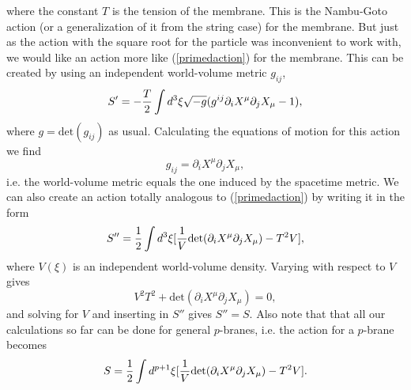 where the constant $T$ is the tension of the membrane. This is the Nambu-Goto action (or a generalization of it from the string case) for the membrane. 
But just as the action with the square root for the particle was inconvenient to work with, we would like an action more like 
(\ref{primedaction}) for the membrane. This can be created by using an independent world-volume metric $g_{ij}$,
\begin{equation}
S'=-{T \over 2}\int d^3 \xi \sqrt{-g} (g^{ij}\partial_i X^{\mu} \partial_j X_{\mu} -1),
\end{equation}
where $g=\mbox{det}(g_{ij})$ as usual. Calculating the equations of motion for this action we find
\begin{equation}
g_{ij}=\partial_i X^{\mu} \partial_j X_{\mu},
\end{equation}
i.e. the world-volume metric equals the one induced by the spacetime metric. We can also create an action totally analogous to (\ref{primedaction}) by writing it in the form
\begin{equation}
S''={1 \over 2}\int d^3 \xi [{1 \over V}\mbox{det}(\partial_i X^{\mu} \partial_j X_{\mu})-T^2V],
\end{equation}
where $V(\xi)$ is an independent world-volume density. Varying with respect to $V$ gives
\begin{equation}
V^2 T^2 + \mbox{det}(\partial_i X^{\mu} \partial_j X_{\mu})=0,
\end{equation}
and solving for $V$ and inserting in $S''$ gives $S'' = S$. Also note that that all our calculations so far can be done for general $p$-branes, i.e. the action for a $p$-brane becomes
\begin{equation}
S={1 \over 2}\int d^{p+1} \xi [{1 \over V}\mbox{det}(\partial_i X^{\mu} \partial_j X_{\mu})-T^2V].
\label{membraneaction}
\end{equation}


